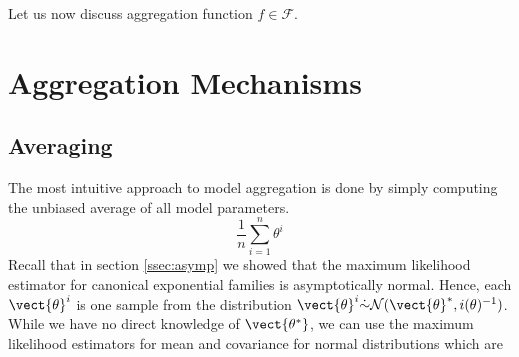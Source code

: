 Let us now discuss aggregation function $f \in \mathcal{F}$.

\section{Aggregation Mechanisms}
\subsection{Averaging}

The most intuitive approach to model aggregation is done by simply computing the unbiased average of all model parameters.
\begin{equation}
    \frac{1}{n} \sum_{i=1}^n \theta^i
\end{equation}
Recall that in section \ref{ssec:asymp} we showed that the maximum likelihood estimator for canonical exponential families is asymptotically normal.
Hence, each $\vect{\theta}^i$ is one sample from the distribution $\vect{\theta}^i \dot{\sim} \mathcal{N}(\vect{\theta}^*, i(\theta)^{-1})$.
While we have no direct knowledge of $\vect{\theta^*}$, we can use the maximum likelihood estimators for mean and covariance for normal distributions which are

